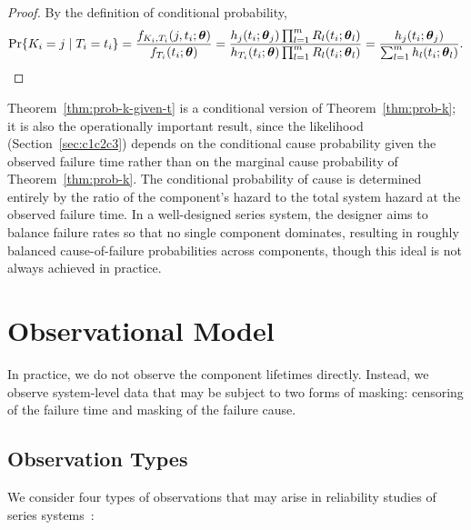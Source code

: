 \documentclass[11pt]{article}
\theoremstyle{definition}
\theoremstyle{plain}
\renewcommand{\v}[1]{\boldsymbol{#1}}
\newcommand{\btheta}{\v{\theta}}
\begin{document}
\begin{proof}
By the definition of conditional probability,
\[
    \Pr\{K_i = j \mid T_i = t_i\}
    = \frac{f_{K_i, T_i}(j, t_i; \btheta)}{f_{T_i}(t_i; \btheta)}
    = \frac{h_j(t_i; \v{\theta}_j) \prod_{l=1}^m R_l(t_i; \v{\theta}_l)}
           {h_{T_i}(t_i; \btheta) \prod_{l=1}^m R_l(t_i; \v{\theta}_l)}
    = \frac{h_j(t_i; \v{\theta}_j)}
           {\sum_{l=1}^m h_l(t_i; \v{\theta}_l)}.
    \qedhere
\]
\end{proof}

Theorem~\ref{thm:prob-k-given-t} is a conditional version of
Theorem~\ref{thm:prob-k}; it is also the operationally important
result, since the likelihood (Section~\ref{sec:c1c2c3}) depends on
the conditional cause probability given the observed failure time
rather than on the marginal cause probability of
Theorem~\ref{thm:prob-k}.
The conditional probability of cause is determined entirely by the
ratio of the component's hazard to the total system hazard at the
observed failure time.
In a well-designed series system, the designer aims to balance failure
rates so that no single component dominates, resulting in roughly
balanced cause-of-failure probabilities across components, though this
ideal is not always achieved in practice.


\section{Observational Model}
\label{sec:observational-model}

In practice, we do not observe the component lifetimes directly.
Instead, we observe system-level data that may be subject to two forms
of masking: censoring of the failure time and masking of the failure
cause.

\subsection{Observation Types}
\label{sec:observation-types}

We consider four types of observations that may arise in reliability
studies of series systems~\citep[see][for background on censored data
in survival analysis]{klein2005survival}:
\end{document}
